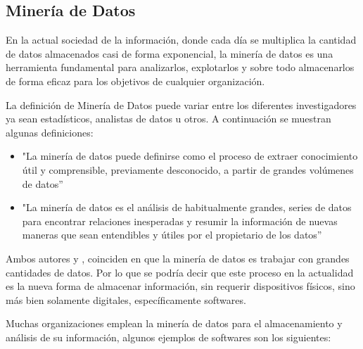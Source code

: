 \documentclass[10pt,journal]{IEEEtran}
\begin{document}
\subsection{\textbf{Minería de Datos}}
En la actual sociedad de la información, donde cada día se multiplica la cantidad de datos almacenados casi de forma exponencial, la minería de datos es una herramienta fundamental para analizarlos, explotarlos y sobre todo almacenarlos de forma eficaz para los objetivos de cualquier organización.\par
La definición de Minería de Datos puede variar entre los diferentes investigadores ya sean estadísticos, analistas de datos u otros. A continuación se muestran algunas definiciones:
\begin{itemize}
    \item "La minería de datos puede definirse como el proceso de extraer conocimiento útil y comprensible, previamente desconocido, a partir de grandes volúmenes de datos” \citep{gonzalez}
    \item "La minería de datos es el análisis de habitualmente grandes, series de datos para encontrar relaciones inesperadas y resumir la información de nuevas maneras que sean entendibles y útiles por el propietario de los datos” \citep{1999}
\end{itemize}
\par Ambos autores \citep{gonzalez} y \citep{1999}, coinciden en que la minería de datos es trabajar con grandes cantidades de datos. 
Por lo que se podría decir que este proceso en la actualidad es la nueva forma de almacenar información, sin requerir dispositivos físicos, sino más bien solamente digitales, específicamente softwares.\par
Muchas organizaciones emplean la minería de datos para el almacenamiento y análisis de su información, algunos ejemplos de softwares son los siguientes:
\end{document}
